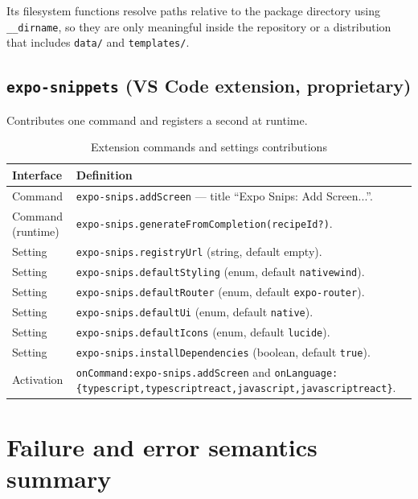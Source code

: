 Its filesystem functions resolve paths relative to the package directory using
\texttt{\_\_dirname}, so they are only meaningful inside the repository or a
distribution that includes \texttt{data/} and \texttt{templates/}.

\subsection*{\texttt{expo-snippets} (VS Code extension, proprietary)}

Contributes one command and registers a second at runtime.

\begin{longtable}{p{5.6cm}p{8.6cm}}
\caption{Extension commands and settings contributions}\\
\toprule
\textbf{Interface} & \textbf{Definition} \\
\midrule

Command & \texttt{expo-snips.addScreen} --- title ``Expo Snips: Add Screen...''. \\
Command (runtime) & \texttt{expo-snips.generateFromCompletion(recipeId?)}. \\
Setting & \texttt{expo-snips.registryUrl} (string, default empty). \\
Setting & \texttt{expo-snips.defaultStyling} (enum, default \texttt{nativewind}). \\
Setting & \texttt{expo-snips.defaultRouter} (enum, default \texttt{expo-router}). \\
Setting & \texttt{expo-snips.defaultUi} (enum, default \texttt{native}). \\
Setting & \texttt{expo-snips.defaultIcons} (enum, default \texttt{lucide}). \\
Setting & \texttt{expo-snips.installDependencies} (boolean, default \texttt{true}). \\
Activation & \texttt{onCommand:expo-snips.addScreen} and
\texttt{onLanguage:\{typescript,\allowbreak typescriptreact,\allowbreak javascript,\allowbreak javascriptreact\}}. \\
\bottomrule
\end{longtable}

\section{Failure and error semantics summary}

